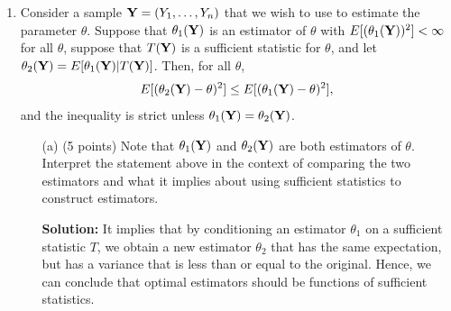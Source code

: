 \documentclass[12pt,letterpaper]{article}
\begin{document}
\begin{enumerate}[leftmargin=*]
\begin{itemize}
    \item[(b)] (10 points) Repeat part [(a)], but this time construct $70\%$ score confidence intervals.
    
    \textbf{Solution:}
\begin{lstlisting}[language=R]
#With 70% confidence
cat("\nCoverage for 70% Score Intervals:\n")
for (s in s_values) {
  coverage <- run_simulation(s, 0.70)
  cat(sprintf("s = %d: %.1f%%\n", s, coverage))
}
\end{lstlisting}

    \textbf{Coverage for 70 $\%$ Score Intervals:}
    \begin{itemize}
        \item s = 5: 80.0\%
        \item s = 10: 90.0\%
        \item s = 100: 70.0\%
        \item s = 1000: 71.2\%
    \end{itemize}

\end{itemize} 

\item Consider a sample $\textbf Y = (Y_1, \dots, Y_n)$ that we wish to use to estimate the parameter $\theta$. Suppose that $\theta_1(\textbf Y)$ is an estimator of $\theta$ with $E[(\theta_1(\textbf Y))^2] < \infty$ for all $\theta$, suppose that $T(\textbf Y)$ is a sufficient statistic for $\theta$, and let $\theta_2(\textbf Y) = E[\theta_1 (\textbf Y) | T(\textbf Y)]$. Then, for all $\theta$,
\begin{equation*} 
E[(\theta_2(\textbf Y) - \theta)^2] \leq E[(\theta_1(\textbf Y) - \theta)^2],
\end{equation*}
and the inequality is strict unless $\theta_1(\textbf Y) = \theta_2(\textbf Y)$.
\begin{itemize}
    \item [(a)] (5 points) Note that $\theta_1(\textbf Y)$ and $\theta_2(\textbf Y)$ are both estimators of $\theta$. Interpret the statement above in the context of comparing the two estimators and what it implies about using sufficient statistics to construct estimators.
    
    \textbf{Solution:}
    It implies that by conditioning an estimator $\theta_1$ on a sufficient statistic $T$, we obtain a new estimator $\theta_2$ that has the same expectation, but has a variance that is less than or equal to the original. Hence, we can conclude that optimal estimators should be functions of sufficient statistics.


\end{itemize}
\end{enumerate}
\end{document}
